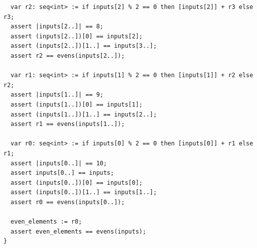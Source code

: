 \documentclass{article}
\begin{document}
\begin{lstlisting}
  var r2: seq<int> := if inputs[2] % 2 == 0 then [inputs[2]] + r3 else r3;
  assert |inputs[2..]| == 8;
  assert (inputs[2..])[0] == inputs[2];
  assert (inputs[2..])[1..] == inputs[3..];
  assert r2 == evens(inputs[2..]);

  var r1: seq<int> := if inputs[1] % 2 == 0 then [inputs[1]] + r2 else r2;
  assert |inputs[1..]| == 9;
  assert (inputs[1..])[0] == inputs[1];
  assert (inputs[1..])[1..] == inputs[2..];
  assert r1 == evens(inputs[1..]);

  var r0: seq<int> := if inputs[0] % 2 == 0 then [inputs[0]] + r1 else r1;
  assert |inputs[0..]| == 10;
  assert inputs[0..] == inputs;
  assert (inputs[0..])[0] == inputs[0];
  assert (inputs[0..])[1..] == inputs[1..];
  assert r0 == evens(inputs[0..]);

  even_elements := r0;
  assert even_elements == evens(inputs);
}
\end{lstlisting}
\end{document}
